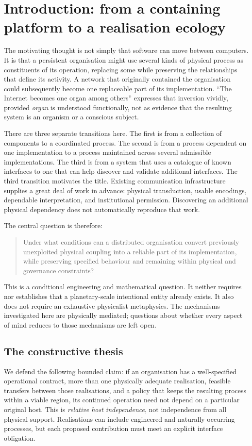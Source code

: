 \documentclass[11pt,a4paper]{article}
\theoremstyle{definition}
\theoremstyle{remark}
\begin{document}
\section{Introduction: from a containing platform to a realisation ecology}
The motivating thought is not simply that software can move between computers. It is that a persistent organisation might use several kinds of physical process as constituents of its operation, replacing some while preserving the relationships that define its activity. A network that originally contained the organisation could subsequently become one replaceable part of its implementation. ``The Internet becomes one organ among others'' expresses that inversion vividly, provided \emph{organ} is understood functionally, not as evidence that the resulting system is an organism or a conscious subject.

There are three separate transitions here. The first is from a collection of components to a coordinated process. The second is from a process dependent on one implementation to a process maintained across several admissible implementations. The third is from a system that uses a catalogue of known interfaces to one that can help discover and validate additional interfaces. The third transition motivates the title. Existing communication infrastructure supplies a great deal of work in advance: physical transduction, usable encodings, dependable interpretation, and institutional permission. Discovering an additional physical dependency does not automatically reproduce that work.

The central question is therefore:
\begin{quote}
Under what conditions can a distributed organisation convert previously unexploited physical coupling into a reliable part of its implementation, while preserving specified behaviour and remaining within physical and governance constraints?
\end{quote}
This is a conditional engineering and mathematical question. It neither requires nor establishes that a planetary-scale intentional entity already exists. It also does not require an exhaustive physicalist metaphysics. The mechanisms investigated here are physically mediated; questions about whether every aspect of mind reduces to those mechanisms are left open.

\subsection{The constructive thesis}
We defend the following bounded claim: if an organisation has a well-specified operational contract, more than one physically adequate realisation, feasible transfers between those realisations, and a policy that keeps the resulting process within a viable region, its continued operation need not depend on a particular original host. This is \emph{relative host independence}, not independence from all physical support. Realisations can include engineered and naturally occurring processes, but each proposed contribution must meet an explicit interface obligation.
\end{document}
